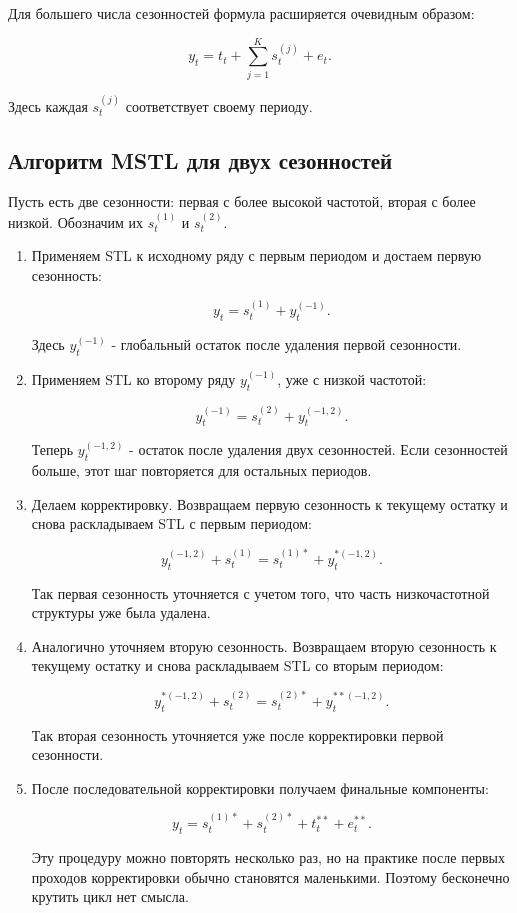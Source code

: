 \documentclass[12pt,fleqn]{article}
\begin{document}
Для большего числа сезонностей формула расширяется очевидным образом:

\[
y_t
=
t_t
+\sum_{j=1}^{K}s_t^{(j)}
+e_t.
\]

Здесь каждая \(s_t^{(j)}\) соответствует своему периоду.

\subsection{Алгоритм MSTL для двух сезонностей}


Пусть есть две сезонности: первая с более высокой частотой, вторая с более низкой.
Обозначим их \(s_t^{(1)}\) и \(s_t^{(2)}\).

\begin{enumerate}
  \item Применяем STL к исходному ряду с первым периодом и достаем первую сезонность:

\[
y_t
=
s_t^{(1)}
+y_t^{(-1)}.
\]

Здесь \(y_t^{(-1)}\) - глобальный остаток после удаления первой сезонности.

  \item Применяем STL ко второму ряду \(y_t^{(-1)}\), уже с низкой частотой:

\[
y_t^{(-1)}
=
s_t^{(2)}
+y_t^{(-1,2)}.
\]

Теперь \(y_t^{(-1,2)}\) - остаток после удаления двух сезонностей.
Если сезонностей больше, этот шаг повторяется для остальных периодов.

  \item Делаем корректировку.
  Возвращаем первую сезонность к текущему остатку и снова раскладываем STL с первым периодом:

\[
y_t^{(-1,2)}
+s_t^{(1)}
=
s_t^{(1)*}
+y_t^{*(-1,2)}.
\]

Так первая сезонность уточняется с учетом того, что часть низкочастотной структуры уже была удалена.

  \item Аналогично уточняем вторую сезонность.
  Возвращаем вторую сезонность к текущему остатку и снова раскладываем STL со вторым периодом:

\[
y_t^{*(-1,2)}
+s_t^{(2)}
=
s_t^{(2)*}
+y_t^{**(-1,2)}.
\]

Так вторая сезонность уточняется уже после корректировки первой сезонности.

  \item После последовательной корректировки получаем финальные компоненты:

\[
y_t
=
s_t^{(1)*}
+s_t^{(2)*}
+t_t^{**}
+e_t^{**}.
\]

Эту процедуру можно повторять несколько раз, но на практике после первых проходов корректировки обычно становятся маленькими.
Поэтому бесконечно крутить цикл нет смысла.

\end{enumerate}
\end{document}

